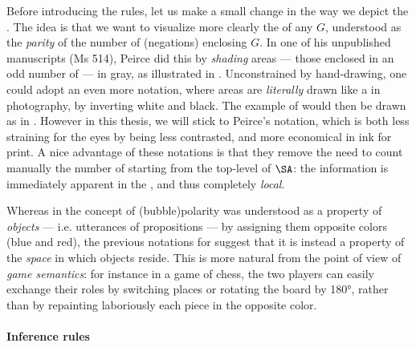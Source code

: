 \begin{scope}
Before introducing the rules, let us make a small change in the way we depict
the . The idea is that we want to visualize more clearly the
 of any  $G$, understood as the \emph{parity} of the
number of  (negations) enclosing $G$. In one of his unpublished manuscripts
(Ms 514), Peirce did this by \emph{shading}  areas --- those enclosed in
an odd number of  --- in gray, as illustrated in 
. Unconstrained by hand-drawing, one could adopt an
even more  notation, where  areas are \emph{literally} drawn like
a  in photography, by inverting white and black. The example of
 would then be drawn as in .
However in this thesis, we will stick to Peirce's notation, which is both less
straining for the eyes by being less contrasted, and more economical in ink for
print. A nice advantage of these notations is that they remove the need to count
manually the number of  starting from the top-level of $\SA$: the
information is immediately apparent in the , and thus completely
\emph{local}.

\begin{remark}
  Whereas in  the concept of \kl(bubble){polarity} was
  understood as a property of \emph{objects} --- i.e. utterances of propositions
  --- by assigning them opposite colors (blue and red), the previous notations
  for  suggest that it is instead a property of the \emph{space} in
  which objects reside. This is more natural from the point of view of
  \emph{game semantics}: for instance in a game of chess, the two players can
  easily exchange their roles by switching places or rotating the board by 180°,
  rather than by repainting laboriously each piece in the opposite color.
\end{remark}

\paragraph{Inference rules}


\end{scope}
